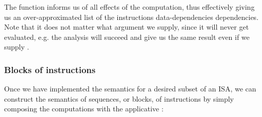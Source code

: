 The  function informs us of all effects of the computation, thus
effectively giving us an over-approximated list of the instructions
data-dependencies dependencies. Note that it does not matter
what argument we supply, since it will never get evaluated, e.g. the analysis will succeed and give us the same result even if we supply .

\subsubsection{Blocks of instructions}

Once we have implemented the semantics for a desired subset of an ISA, we can construct the
semantics of sequences, or blocks, of instructions by simply composing the  computations
with the applicative \hs{*>}:


